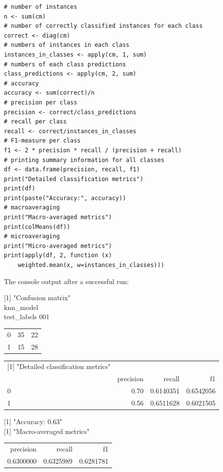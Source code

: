 \documentclass[10pt]{book}
\begin{document}
\begin{verbatim}
# number of instances
n <- sum(cm)
# number of correctly classified instances for each class
correct <- diag(cm)
# numbers of instances in each class
instances_in_classes <- apply(cm, 1, sum)
# numbers of each class predictions
class_predictions <- apply(cm, 2, sum)
# accuracy
accuracy <- sum(correct)/n
# precision per class
precision <- correct/class_predictions
# recall per class
recall <- correct/instances_in_classes
# F1-measure per class
f1 <- 2 * precision * recall / (precision + recall)
# printing summary information for all classes
df <- data.frame(precision, recall, f1)
print("Detailed classification metrics")
print(df)
print(paste("Accuracy:", accuracy))
# macroaveraging
print("Macro-averaged metrics")
print(colMeans(df))
# microaveraging
print("Micro-averaged metrics")
print(apply(df, 2, function (x)
    weighted.mean(x, w=instances_in_classes)))
\end{verbatim}

The console output after a successful run:

[1] "Confusion matrix"\\
knn\_model\\
test\_labels 001

\begin{center}
\begin{tabular}{lll}
0 & 35 & 22 \\
1 & 15 & 28 \\
\end{tabular}
\end{center}

\begin{center}
\begin{tabular}{lrrr}
[1] "Detailed classification metrics" &  &  &  \\
 & precision & recall & f1 \\
0 & 0.70 & 0.6140351 & 0.6542056 \\
1 & 0.56 & 0.6511628 & 0.6021505 \\
\end{tabular}
\end{center}

[1] "Accuracy: 0.63"\\[0pt]
[1] "Macro-averaged metrics"

\begin{center}
\begin{tabular}{rrr}
precision & recall & f1 \\
0.6300000 & 0.6325989 & 0.6281781 \\
\end{tabular}
\end{center}
\end{document}
